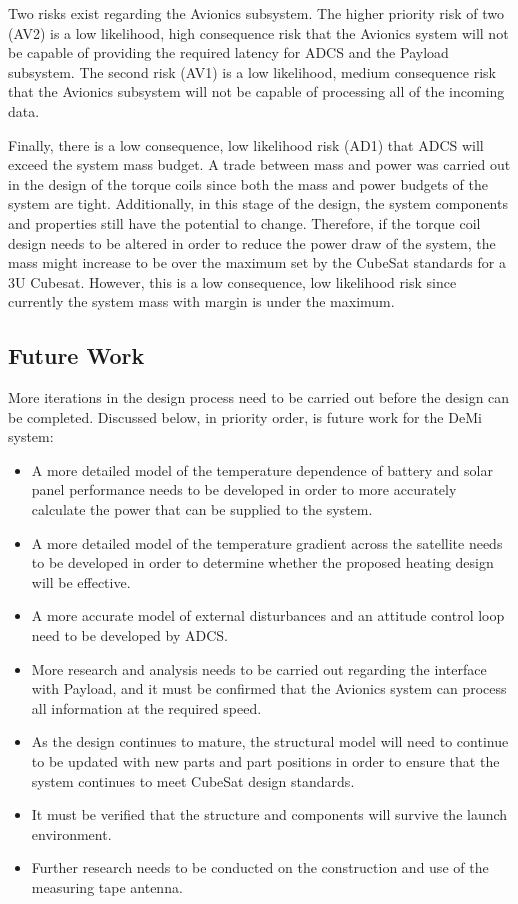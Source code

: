 \documentclass[12pt]{article}
\begin{document}
Two risks exist regarding the Avionics subsystem.  The higher priority risk of two (AV2) is a low likelihood, high consequence risk that the Avionics system will not be capable of providing the required latency for ADCS and the Payload subsystem.  The second risk (AV1) is a low likelihood, medium consequence risk that the Avionics subsystem will not be capable of processing all of the incoming data.  

Finally, there is a low consequence, low likelihood risk (AD1) that ADCS will exceed the system mass budget.  A trade between mass and power was carried out in the design of the torque coils since both the mass and power budgets of the system are tight.  Additionally, in this stage of the design, the system components and properties still have the potential to change.  Therefore, if the torque coil design needs to be altered in order to reduce the power draw of the system, the mass might increase to be over the maximum set by the CubeSat standards for a 3U Cubesat.  However, this is a low consequence, low likelihood risk since currently the system mass with margin is under the maximum.

		\subsection{Future Work}\label{sec:conclustions_futurework}
More iterations in the design process need to be carried out before the design can be completed.  Discussed below, in priority order, is future work for the DeMi system:
\begin{itemize}
\item A more detailed model of the temperature dependence of battery and solar panel performance needs to be developed in order to more accurately calculate the power that can be supplied to the system.  
\item A more detailed model of the temperature gradient across the satellite needs to be developed in order to determine whether the proposed heating design will be effective.  
\item A more accurate model of external disturbances and an attitude control loop need to be developed by ADCS.
\item More research and analysis needs to be carried out regarding the interface with Payload, and it must be confirmed that the Avionics system can process all information at the required speed.  
\item As the design continues to mature, the structural model will need to continue to be updated with new parts and part positions in order to ensure that the system continues to meet CubeSat design standards.
\item It must be verified that the structure and components will survive the launch environment.
\item Further research needs to be conducted on the construction and use of the measuring tape antenna.  
\end{itemize}
\end{document}
